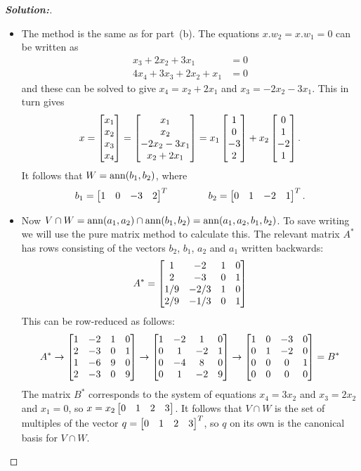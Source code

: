 \documentclass[a4paper]{amsart}
\theoremstyle{definition}
\newenvironment{solution}{\begin{proof}[\textbf{Solution:}] \vphantom{u}}{\end{proof}}
\begin{document}
\begin{solution}
\begin{itemize}
   \[ a_1 = \bbm 1&0&-1/3&2/9\ebm^T \hspace{4em}
      a_2 = \bbm 0&1&-2/3&1/9\ebm^T. 
   \]
  \item[(c)] The method is the same as for part~(b).  The equations
   $x.w_2=x.w_1=0$ can be written as
   \begin{align*}
    x_3 + 2x_2 + 3x_1 &= 0 \\
    4x_4+ 3x_3 + 2x_2 + x_1 &= 0 
   \end{align*}
   and these can be solved to give $x_4=x_2+2x_1$ and
   $x_3=-2x_2-3x_1$.  This in turn gives
   \[ x = \left[\begin{matrix} x_1\\x_2\\x_3\\x_4 \end{matrix}\right] 
      = \left[\begin{matrix} x_1 \\ x_2 \\ -2x_2-3x_1 \\ x_2+2x_1 \end{matrix}\right] 
      = x_1 \left[\begin{matrix} 1 \\ 0 \\ -3 \\ 2 \end{matrix}\right] +
        x_2 \left[\begin{matrix} 0 \\ 1 \\ -2 \\ 1 \end{matrix}\right].
   \]
   It follows that $W=\operatorname{ann}(b_1,b_2)$, where 
   \[ b_1 = \left[\begin{matrix} 1&0&-3&2\end{matrix}\right]^T \hspace{4em}
      b_2 = \left[\begin{matrix} 0&1&-2&1\end{matrix}\right]^T. 
   \]
  \item[(d)] Now
   $V\cap W=\operatorname{ann}(a_1,a_2)\cap\operatorname{ann}(b_1,b_2)=\operatorname{ann}(a_1,a_2,b_1,b_2)$.  
   To save writing we will use the pure matrix method to calculate
   this.  The relevant matrix $A^*$ has rows consisting of the vectors
   $b_2$, $b_1$, $a_2$ and $a_1$ written backwards:
   \[ A^* =
       \left[\begin{matrix}
        1 & -2 & 1 & 0 \\
        2 & -3 & 0 & 1 \\
        1/9 & -2/3 & 1 & 0 \\
        2/9 & -1/3 & 0 & 1
       \end{matrix}\right]
   \]
   This can be row-reduced as follows:
   \[ A^* \to 
       \left[\begin{matrix}
        1 & -2 & 1 & 0 \\
        2 & -3 & 0 & 1 \\
        1 & -6 & 9 & 0 \\
        2 & -3 & 0 & 9
       \end{matrix}\right]
       \to
       \left[\begin{matrix}
        1 & -2 & 1 & 0 \\
        0 &  1 &-2 & 1 \\
        0 & -4 & 8 & 0 \\
        0 &  1 &-2 & 9
       \end{matrix}\right]
       \to
       \left[\begin{matrix}
        1 &  0 &-3 & 0 \\
        0 &  1 &-2 & 0 \\
        0 &  0 & 0 & 1 \\
        0 &  0 & 0 & 0
       \end{matrix}\right]  =B^*
   \]
   The matrix $B^*$ corresponds to the system of equations $x_4=3x_2$
   and $x_3=2x_2$ and $x_1=0$, so $x=x_2\left[\begin{matrix} 0&1&2&3\end{matrix}\right]$.  It follows
   that $V\cap W$ is the set of multiples of the vector
   $q=\left[\begin{matrix} 0&1&2&3\end{matrix}\right]^T$, so $q$ on its own is the canonical basis
   for $V\cap W$.
 \end{itemize}
\end{solution}
\end{document}

